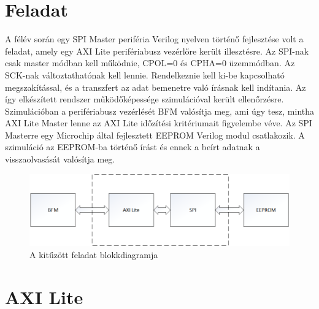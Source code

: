 \documentclass[a4paper,11pt]{article}
\begin{document}
\section{Feladat}
A félév során egy SPI Master periféria Verilog nyelven történő fejlesztése volt a feladat, amely egy AXI Lite perifériabusz vezérlőre került illesztésre. Az SPI-nak csak master módban kell működnie, CPOL=0 és CPHA=0 üzemmódban. Az SCK-nak változtathatónak kell lennie. Rendelkeznie kell ki-be kapcsolható megszakítással, és a transzfert az adat bemenetre való írásnak kell indítania. Az így elkészített rendszer működőképessége szimulációval került ellenőrzésre. Szimulációban a perifériabusz vezérlését BFM valósítja meg, ami úgy tesz, mintha AXI Lite Master lenne az AXI Lite időzítési kritériumait figyelembe véve. Az SPI Masterre egy Microchip által fejlesztett EEPROM Verilog modul csatlakozik. A szimuláció az EEPROM-ba történő írást és ennek a beírt adatnak a visszaolvasását valósítja meg.
\begin{figure}[H]
	\begin{center}
	\includegraphics[scale=0.7]{genbd.png}
	\caption{A kitűzött feladat blokkdiagramja}
	\label{fig:genbd}
	\end{center}
\end{figure}

\section{AXI Lite}
\end{document}
